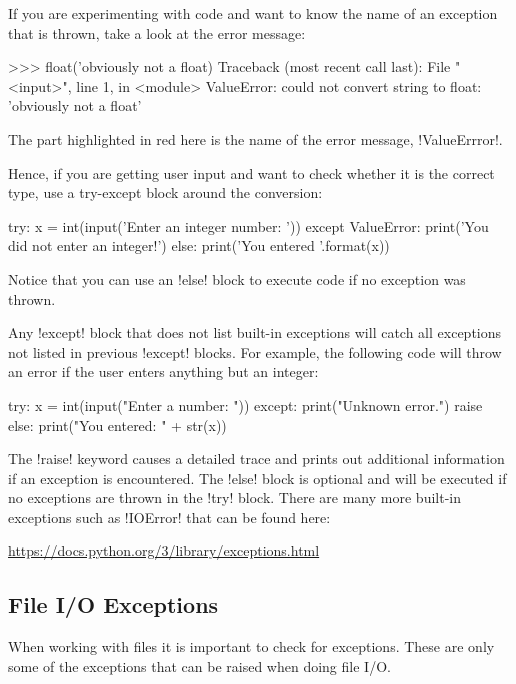 \documentclass[11pt]{cselabheader}
\begin{document}
If you are experimenting with code and want to know the name of an exception
that is thrown, take a look at the error message:

\begin{pyconcode}
>>> float('obviously not a float)
Traceback (most recent call last):
  File "<input>", line 1, in <module>
ValueError: could not convert string to float: 'obviously not a float'
\end{pyconcode}

The part highlighted in red here is the name of the error message,
\pythoninline!ValueErrror!.

Hence, if you are getting user input and want to check whether it is the
correct type, use a try-except block around the conversion:

\begin{python3code}
try:
    x = int(input('Enter an integer number: '))
except ValueError:
    print('You did not enter an integer!')
else:
    print('You entered {}'.format(x))
\end{python3code}

Notice that you can use an \pythoninline!else! block to execute code if no
exception was thrown.

Any \pythoninline!except!  block that does not list built-in exceptions will
catch all exceptions not listed in previous \pythoninline!except! blocks.
For example, the following code will throw an error if the user enters
anything but an integer:

\begin{python3code}
try:
    x = int(input("Enter a number: "))
except:
    print("Unknown error.")
    raise
else:
    print("You entered: " + str(x))
\end{python3code}

The \pythoninline!raise! keyword causes a detailed trace and prints out
additional information if an exception is encountered.  The
\pythoninline!else! block is optional and will be executed if no exceptions
are thrown in the \pythoninline!try! block.  There are many more built-in
exceptions such as \pythoninline!IOError! that can be found here:

\begin{center}
\url{https://docs.python.org/3/library/exceptions.html}
\end{center}

\subsection{File I/O Exceptions}
When working with files it is important to check for exceptions.
These are only some of the exceptions that can be raised when doing file I/O.
\end{document}
